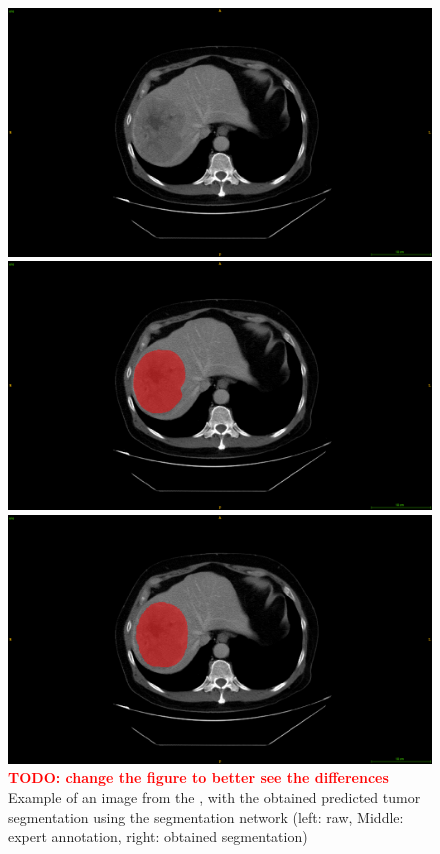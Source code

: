 \begin{figure}
\begin{minipage}{0.3\linewidth}
\includegraphics[width=\linewidth]{./images/image13.png}
\end{minipage}
\hspace{0.1cm}
\begin{minipage}{0.3\linewidth}
\includegraphics[width=\linewidth]{./images/image10.png}
\end{minipage}
\hspace{0.1cm}
\begin{minipage}{0.3\linewidth}
\includegraphics[width=\linewidth]{./images/image7.png}
\end{minipage}
\caption{\textcolor{red}{\textbf{TODO: change the figure to better see the differences}}
Example of an image from the , with the obtained predicted tumor
segmentation using the  segmentation network (left: raw,
Middle: expert annotation, right: obtained segmentation)}
\label{fig:TCIAMultiphaseTumorPred}
\end{figure}


